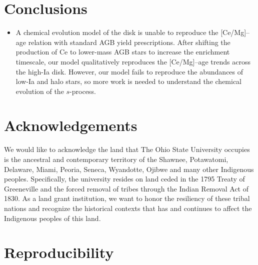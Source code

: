 \documentclass[twocolumn,twocolappendix]{aastex701}
\begin{document}
\section{Conclusions}
\label{sec:conclusions}

\begin{itemize}
    \item A chemical evolution model of the disk is unable to reproduce the [Ce/Mg]--age relation with standard AGB yield prescriptions. After shifting the production of Ce to lower-mass AGB stars to increase the enrichment timescale, our model qualitatively reproduces the [Ce/Mg]--age trends across the high-Ia disk. However, our model fails to reproduce the abundances of low-Ia and halo stars, so more work is needed to understand the chemical evolution of the $s$-process.
\end{itemize}

\section*{Acknowledgements}

We would like to acknowledge the land that The Ohio State University occupies is the ancestral and contemporary territory of the Shawnee, Potawatomi, Delaware, Miami, Peoria, Seneca, Wyandotte, Ojibwe and many other Indigenous peoples. Specifically, the university resides on land ceded in the 1795 Treaty of Greeneville and the forced removal of tribes through the Indian Removal Act of 1830. As a land grant institution, we want to honor the resiliency of these tribal nations and recognize the historical contexts that has and continues to affect the Indigenous peoples of this land.

\software{}

\appendix

\section{Reproducibility}
\label{app:reproducibility}



\end{document}
